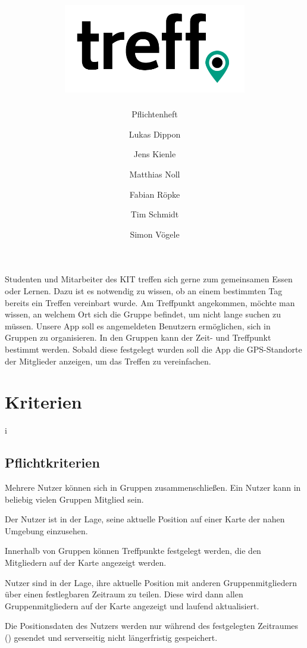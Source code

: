 \documentclass[parskip=full,11pt]{scrartcl}
\title{\includegraphics[width = 80mm]{images/logo_crop.png}}
\subtitle{Pflichtenheft}
\author{Lukas Dippon
        \and Jens Kienle
        \and Matthias Noll
        \and Fabian Röpke
        \and Tim Schmidt
        \and Simon Vögele}
\begin{document}
\maketitle
\thispagestyle{empty} %

\section*{} %
Studenten und Mitarbeiter des KIT treffen sich gerne zum gemeinsamen Essen oder Lernen.
Dazu ist es notwendig zu wissen, ob an einem bestimmten Tag bereits ein Treffen vereinbart wurde.
Am Treffpunkt angekommen, möchte man wissen, an welchem Ort sich die Gruppe befindet, um nicht lange suchen zu müssen.
Unsere App soll es angemeldeten Benutzern ermöglichen, sich in Gruppen zu organisieren.
In den Gruppen kann der Zeit- und Treffpunkt bestimmt werden.
Sobald diese festgelegt wurden soll die App die GPS-Standorte der Mitglieder anzeigen, um das Treffen zu vereinfachen.

\pagebreak
\tableofcontents

\pagebreak
\section{Kriterien}i

\subsection{Pflichtkriterien}
Mehrere Nutzer können sich in Gruppen zusammenschließen.
Ein Nutzer kann in beliebig vielen Gruppen Mitglied sein.

Der Nutzer ist in der Lage, seine aktuelle Position auf einer Karte der nahen
Umgebung einzusehen.

Innerhalb von Gruppen können Treffpunkte festgelegt werden,
die den Mitgliedern auf der Karte angezeigt werden.

Nutzer sind in der Lage, ihre aktuelle Position mit anderen Gruppenmitgliedern
über einen festlegbaren Zeitraum zu teilen.
Diese wird dann allen Gruppenmitgliedern auf der Karte angezeigt und laufend
aktualisiert.

Die Positionsdaten des Nutzers werden nur während des festgelegten Zeitraumes
() gesendet und serverseitig nicht
längerfristig gespeichert.
\end{document}
